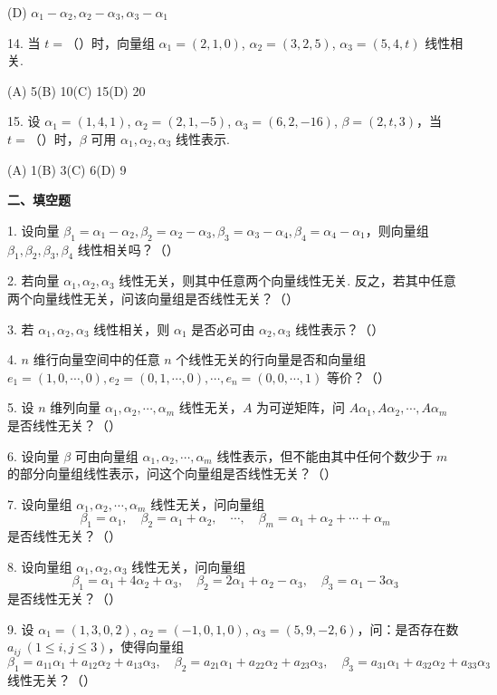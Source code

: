 \documentclass[UTF8,12pt,a4paper,fontset=fandol]{ctexart}
\begin{document}
(D) $\alpha_1-\alpha_2,\alpha_2-\alpha_3,\alpha_3-\alpha_1$

14. 当 $t=$（\quad）时，向量组 $\alpha_1=(2,1,0)$, $\alpha_2=(3,2,5)$, $\alpha_3=(5,4,t)$ 线性相关.

(A) 5\qquad (B) 10\qquad (C) 15\qquad (D) 20

15. 设 $\alpha_1=(1,4,1)$, $\alpha_2=(2,1,-5)$, $\alpha_3=(6,2,-16)$, $\beta=(2,t,3)$，当 $t=$（\quad）时，$\beta$ 可用 $\alpha_1,\alpha_2,\alpha_3$ 线性表示.

(A) 1\qquad (B) 3\qquad (C) 6\qquad (D) 9

\noindent\textbf{二、填空题}

1. 设向量 $\beta_1=\alpha_1-\alpha_2,\beta_2=\alpha_2-\alpha_3,\beta_3=\alpha_3-\alpha_4,\beta_4=\alpha_4-\alpha_1$，则向量组 $\beta_1,\beta_2,\beta_3,\beta_4$ 线性相关吗？（\quad）

2. 若向量 $\alpha_1,\alpha_2,\alpha_3$ 线性无关，则其中任意两个向量线性无关. 反之，若其中任意两个向量线性无关，问该向量组是否线性无关？（\quad）

3. 若 $\alpha_1,\alpha_2,\alpha_3$ 线性相关，则 $\alpha_1$ 是否必可由 $\alpha_2,\alpha_3$ 线性表示？（\quad）

4. $n$ 维行向量空间中的任意 $n$ 个线性无关的行向量是否和向量组 $e_1=(1,0,\cdots,0),e_2=(0,1,\cdots,0),\cdots,e_n=(0,0,\cdots,1)$ 等价？（\quad）

5. 设 $n$ 维列向量 $\alpha_1,\alpha_2,\cdots,\alpha_m$ 线性无关，$A$ 为可逆矩阵，问 $A\alpha_1,A\alpha_2,\cdots,A\alpha_m$ 是否线性无关？（\quad）

6. 设向量 $\beta$ 可由向量组 $\alpha_1,\alpha_2,\cdots,\alpha_m$ 线性表示，但不能由其中任何个数少于 $m$ 的部分向量组线性表示，问这个向量组是否线性无关？（\quad）

7. 设向量组 $\alpha_1,\alpha_2,\cdots,\alpha_m$ 线性无关，问向量组
\[
\beta_1=\alpha_1,\quad \beta_2=\alpha_1+\alpha_2,\quad \cdots,\quad \beta_m=\alpha_1+\alpha_2+\cdots+\alpha_m
\]
是否线性无关？（\quad）

8. 设向量组 $\alpha_1,\alpha_2,\alpha_3$ 线性无关，问向量组
\[
\beta_1=\alpha_1+4\alpha_2+\alpha_3,\quad \beta_2=2\alpha_1+\alpha_2-\alpha_3,\quad \beta_3=\alpha_1-3\alpha_3
\]
是否线性无关？（\quad）

9. 设 $\alpha_1=(1,3,0,2)$, $\alpha_2=(-1,0,1,0)$, $\alpha_3=(5,9,-2,6)$，问：是否存在数 $a_{ij}\ (1\le i,j\le 3)$，使得向量组
\[
\beta_1=a_{11}\alpha_1+a_{12}\alpha_2+a_{13}\alpha_3,\quad
\beta_2=a_{21}\alpha_1+a_{22}\alpha_2+a_{23}\alpha_3,\quad
\beta_3=a_{31}\alpha_1+a_{32}\alpha_2+a_{33}\alpha_3
\]
线性无关？（\quad）
\end{document}
